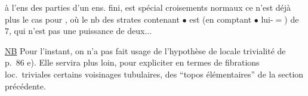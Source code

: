 
à l'ens des parties d'un ens. fini, est spécial  croisements normaux ce n'est déjà plus le cas pour
, où le nb des strates contenant $\bullet$ est (en comptant $\bullet$ lui-$=$) de $7$, qui n'est pas une puissance de deux...

\uline{NB} Pour l'instant, on n'a pas fait usage de l'hypothèse  de locale trivialité de p.\ 86 e). Elle servira plus loin, pour expliciter en termes de fibrations loc.\ triviales certains voisinages tubulaires,   des ``topos élémentaires'' de la section précédente.

